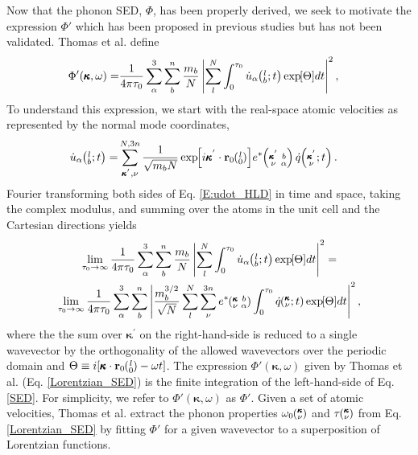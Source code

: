 \documentclass[aps,prb,preprint,superscriptaddress,amsmath,amssymb,floatfix]{revtex4}
\newcommand{\EXP}[1]{\exp\mspace{-5.0mu}\left[#1\right]\mspace{-3.0mu}}
\newcommand{\SUMprime}[2]{\ifthenelse{\equal{#1}{0}}{\sum_{\alpha_{#2},b_{#2},l_{#2}}^{3,n,N}} {\ifthenelse{\equal{#1}{1}}{\sum_{\alpha_{#2},b_{#2}}^{3,n}}{\sum_{\pmb{\kappa}^{'}#2,\nu#2}^{N,3n}}}}
\newcommand{\ab}[2]{\mspace{-4.0mu}\left(\mspace{-8.0mu}\begin{smallmatrix}&\ifthenelse{\equal{#1}{}}{a}{#1} \\&\ifthenelse{\equal{#2}{}}{b}{#2}\end{smallmatrix}\mspace{-3.0mu}\right)}
\newcommand{\kvba}{\mspace{-4.0mu}\left(\mspace{-8.0mu}\begin{smallmatrix} &\pmb{\kappa} &b \\ &\nu &\alpha\end{smallmatrix}\mspace{-3.0mu}\right)}
\newcommand{\kpvba}{\mspace{-4.0mu}\left(\mspace{-8.0mu}\begin{smallmatrix} &\pmb{\kappa}^{'} &b \\ &\nu &\alpha\end{smallmatrix}\mspace{-3.0mu}\right)}
\newcommand{\kvt}{\mspace{-4.0mu}\left(\mspace{-8.0mu}\begin{smallmatrix}&\pmb{\kappa} \\&\nu\end{smallmatrix}\mspace{-2.0mu};t\right)}
\newcommand{\kpvt}{\mspace{-4.0mu}\left(\mspace{-8.0mu}\begin{smallmatrix}&\pmb{\kappa}^{'} \\&\nu\end{smallmatrix}\mspace{-2.0mu};t\right)}
\newcommand{\kv}{\mspace{-4.0mu}\left(\mspace{-8.0mu}\begin{smallmatrix}&\pmb{\kappa} \\&\nu\end{smallmatrix}\mspace{-3.0mu}\right)}
\newcommand{\lbt}{\mspace{-4.0mu}\left(\mspace{-8.0mu}\begin{smallmatrix}&l \\&b\end{smallmatrix}\mspace{-2.0mu};t\right)}
\begin{document}
Now that the phonon SED, $\Phi$, has been properly derived, we seek to motivate the expression $\Phi'$ which has been proposed in previous studies but has not been validated.\cite{maruyama2003,shiomi2006,thomas2010c} Thomas et al. \cite{thomas2010c} define
\begin{equation}\label{Lorentzian_SED}
\begin{split}
\Phi'(\pmb{\kappa},\omega) =& \frac{1}{4\pi\tau_0} \sum_\alpha^3 \sum_b^n \frac{m_b}{N}\left| \sum_l^N  \int_{0}^{\tau_0} \dot{u}_{\alpha}\lbt \EXP{\Theta} dt \right|^2,
\end{split}
\end{equation}
To understand this expression, we start with the real-space atomic velocities as
represented by the normal mode coordinates,\cite{dove1993}
\begin{equation}\label{E:udot_HLD}
\begin{split}
\dot{u}_{\alpha}\lbt = &\SUMprime{2}{} \frac{1}{\sqrt{m_bN}} \EXP{i\pmb{\kappa}^{'}\cdot\mathbf{r}_0\ab{l}{0}} e^*\kpvba \dot{q}\kpvt{}{}{}.
\end{split}
\end{equation}
Fourier transforming both sides of Eq$.$ \eqref{E:udot_HLD} in time and space, taking the complex modulus, and summing over the atoms in the unit cell and the Cartesian directions yields
\begin{multline}\label{SED}
\lim_{\tau_0\rightarrow\infty}\frac{1}{4\pi\tau_0} \sum_\alpha^3 \sum_b^n \frac{m_b}{N} \left\lvert \sum_l^N  \int_{0}^{\tau_0} \dot{u}_{\alpha}\lbt \EXP{\Theta} dt \right\rvert^2 =
\\ \lim_{\tau_0\rightarrow\infty}\frac{1}{4\pi\tau_0} \sum_\alpha^3 \sum_b^n \left\lvert \frac{m_b^{3/2}}{\sqrt{N}} \sum_l^N \sum_{\nu}^{3n} e^*\kvba \int_{0}^{\tau_0}\dot{q}\kvt\EXP{\Theta}dt \right\rvert^2 ,
\end{multline}
where the the sum over $\pmb{\kappa}^{'}$ on the right-hand-side is reduced to a single wavevector by the orthogonality of the allowed wavevectors over the periodic domain and $\Theta \equiv i[\pmb{\kappa}\cdot\mathbf{r}_0\ab{l}{0}-\omega t]$. The expression $\Phi'(\pmb{\kappa},\omega)$ given by Thomas et al. \cite{thomas2010c} (Eq$.$ \eqref{Lorentzian_SED}) is the finite integration of the left-hand-side of Eq$.$ \eqref{SED}. For simplicity, we refer to $\Phi'(\pmb{\kappa},\omega)$ as $\Phi'$. Given a set of atomic velocities, Thomas et al. extract the phonon properties $\omega_0\kv$ and $\tau\kv$ from Eq$.$ \eqref{Lorentzian_SED} by fitting $\Phi'$ for a given wavevector to a superposition of Lorentzian functions.
\end{document}
